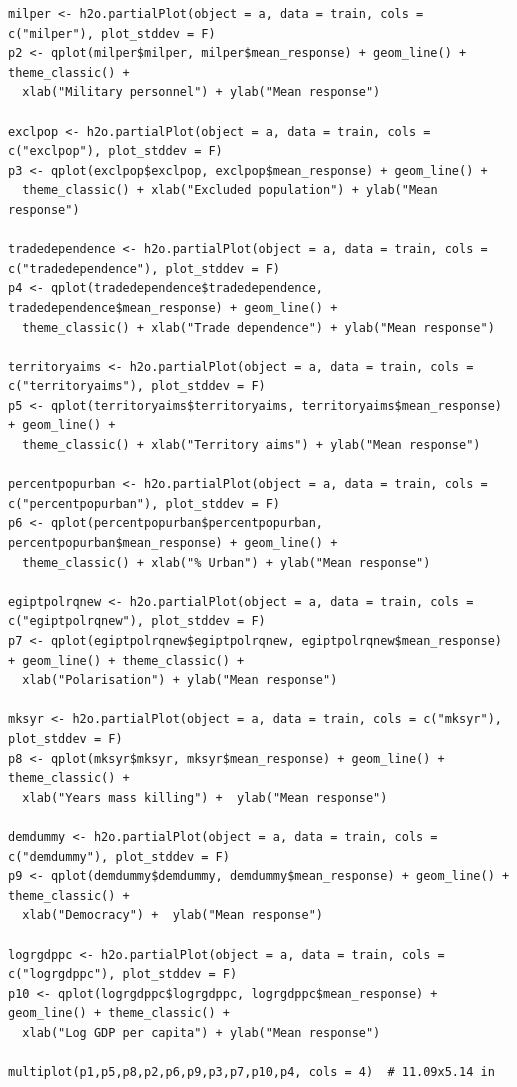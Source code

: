 \documentclass[a4paper,12pt]{article}
\begin{document}
\begin{verbatim}
milper <- h2o.partialPlot(object = a, data = train, cols = c("milper"), plot_stddev = F)
p2 <- qplot(milper$milper, milper$mean_response) + geom_line() + theme_classic() +
  xlab("Military personnel") + ylab("Mean response")

exclpop <- h2o.partialPlot(object = a, data = train, cols = c("exclpop"), plot_stddev = F)
p3 <- qplot(exclpop$exclpop, exclpop$mean_response) + geom_line() +
  theme_classic() + xlab("Excluded population") + ylab("Mean response")

tradedependence <- h2o.partialPlot(object = a, data = train, cols = c("tradedependence"), plot_stddev = F)
p4 <- qplot(tradedependence$tradedependence, tradedependence$mean_response) + geom_line() +
  theme_classic() + xlab("Trade dependence") + ylab("Mean response")

territoryaims <- h2o.partialPlot(object = a, data = train, cols = c("territoryaims"), plot_stddev = F)
p5 <- qplot(territoryaims$territoryaims, territoryaims$mean_response) + geom_line() +
  theme_classic() + xlab("Territory aims") + ylab("Mean response")

percentpopurban <- h2o.partialPlot(object = a, data = train, cols = c("percentpopurban"), plot_stddev = F)
p6 <- qplot(percentpopurban$percentpopurban, percentpopurban$mean_response) + geom_line() +
  theme_classic() + xlab("% Urban") + ylab("Mean response")

egiptpolrqnew <- h2o.partialPlot(object = a, data = train, cols = c("egiptpolrqnew"), plot_stddev = F)
p7 <- qplot(egiptpolrqnew$egiptpolrqnew, egiptpolrqnew$mean_response) + geom_line() + theme_classic() +
  xlab("Polarisation") + ylab("Mean response")

mksyr <- h2o.partialPlot(object = a, data = train, cols = c("mksyr"), plot_stddev = F)
p8 <- qplot(mksyr$mksyr, mksyr$mean_response) + geom_line() + theme_classic() + 
  xlab("Years mass killing") +  ylab("Mean response")

demdummy <- h2o.partialPlot(object = a, data = train, cols = c("demdummy"), plot_stddev = F)
p9 <- qplot(demdummy$demdummy, demdummy$mean_response) + geom_line() + theme_classic() + 
  xlab("Democracy") +  ylab("Mean response")

logrgdppc <- h2o.partialPlot(object = a, data = train, cols = c("logrgdppc"), plot_stddev = F)
p10 <- qplot(logrgdppc$logrgdppc, logrgdppc$mean_response) + geom_line() + theme_classic() +
  xlab("Log GDP per capita") + ylab("Mean response")

multiplot(p1,p5,p8,p2,p6,p9,p3,p7,p10,p4, cols = 4)  # 11.09x5.14 in


\end{verbatim}
\end{document}
